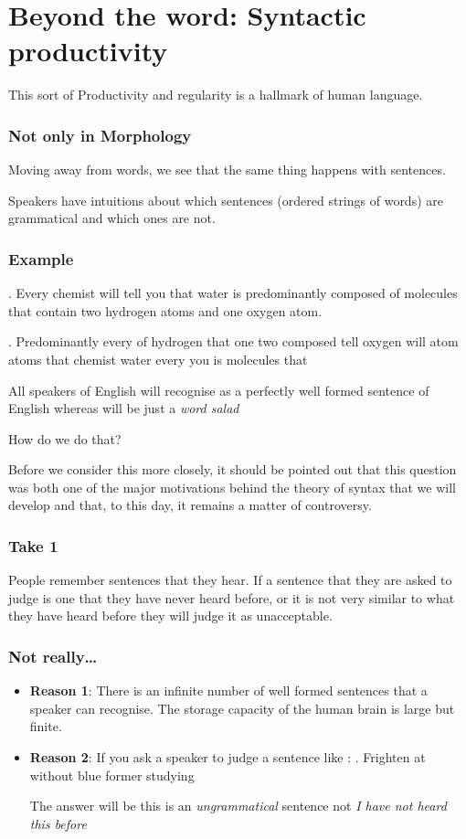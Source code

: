 \section{Beyond the word: Syntactic productivity}

\begin{frame}
This sort of  Productivity and regularity is a hallmark of human language. 
\end{frame}
\begin{frame}
  \frametitle{Not only in Morphology}

Moving away from words, we see that the same thing happens with sentences.

Speakers have intuitions about which sentences (ordered strings of words) are grammatical and which ones are not.

\end{frame}


\begin{frame}
  \frametitle{Example}

\ex.
Every chemist will tell you that water is predominantly composed of molecules that contain two hydrogen atoms and one oxygen atom.

\ex.
Predominantly every of hydrogen that one two composed tell oxygen will atom atoms that chemist water every you is molecules that

All speakers of English will recognise \LLast as a perfectly well formed sentence of English whereas \Last will be just a \textit{word salad}

\pause

How do we do that?
\end{frame}

\begin{frame}
  Before we consider this more closely, it should be pointed out that this question was both one of the major motivations behind the theory of syntax that we will develop and that, to this day, it remains a matter of controversy.
\end{frame}

\begin{frame}
  \frametitle{Take 1}
People remember sentences that they hear.  If a sentence that they are asked to judge is one that they have never heard before, or it is not very similar to what they have heard before they will judge it as unacceptable. 
\end{frame}


\begin{frame}
  \frametitle{Not really\ldots}
  \begin{itemize}
  \item \textbf{Reason 1}:  There is an infinite number of well formed sentences that a speaker can recognise.  The storage capacity of the human brain is large but finite.  
  \item \textbf{Reason 2}: If you ask a speaker to judge a sentence like :
\ex.
Frighten at without blue former studying

The answer will be this is an \textit{ungrammatical} sentence not \textit{I have not heard this before}
  \end{itemize}
\end{frame}

